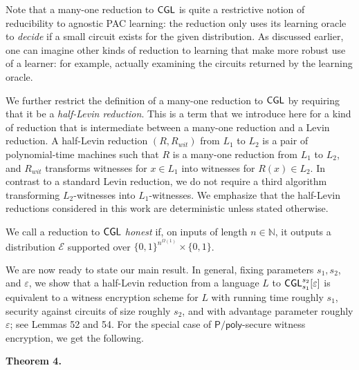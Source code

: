 Note that a many-one reduction to ${\sf CGL}$ is quite a restrictive notion of reducibility to agnostic PAC learning: the reduction only uses its learning oracle to \emph{decide} if a small circuit exists for the given distribution. As discussed earlier, one can imagine other kinds of reduction to learning that make more robust use of a learner: for example, actually examining the circuits returned by the learning oracle.\par




We further restrict the definition of a many-one reduction to ${\sf CGL}$ by requiring that it be a \emph{half-Levin reduction}. This is a term that we introduce here for a kind of reduction that is intermediate between a many-one reduction and a Levin reduction. A half-Levin reduction $(R,R_{wit})$ from $L_{1}$ to $L_{2}$ is a pair of polynomial-time machines such that $R$ is a many-one reduction from $L_{1}$ to $L_{2}$, and $R_{wit}$ transforms witnesses for $x\in L_{1}$ into witnesses for $R(x)\in L_{2}$. In contrast to a standard Levin reduction, we do not require a third algorithm transforming $L_{2}$-witnesses into $L_{1}$-witnesses. We emphasize that the half-Levin reductions considered in this work are deterministic unless stated otherwise.\par




We call a reduction to ${\sf CGL}$ \emph{honest} if, on inputs of length $n\in\mathbb{N}$, it outputs a distribution $\mathcal{E}$ supported over $\{0,1\}^{n^{\Omega(1)}}\times\{0,1\}$.\par




We are now ready to state our main result. In general, fixing parameters $s_{1},s_{2}$, and $\varepsilon$, we show that a half-Levin reduction from a language $L$ to ${\sf CGL}_{s_{1}}^{s_{2}}[\varepsilon]$ is equivalent to a witness encryption scheme for $L$ with running time roughly $s_{1}$, security against circuits of size roughly $s_{2}$, and with advantage parameter roughly $\varepsilon$; see Lemmas 52 and 54. For the special case of ${\mathsf{P}}/{\mathsf{poly}}$-secure witness encryption, we get the following.\par





\par\medskip\noindent\textbf{
\textbf{Theorem 4}\textbf{.}
}\par



